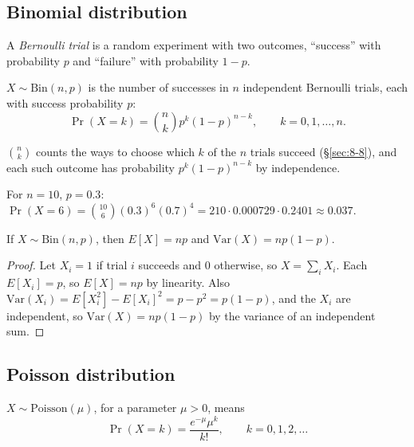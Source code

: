 \subsection{Binomial distribution}
\label{sec:10-8}

\begin{definition}
A \emph{Bernoulli trial} is a random experiment with two outcomes, ``success'' with probability $p$ and ``failure'' with probability $1-p$.
\end{definition}

\begin{definition}
$X\sim\mathrm{Bin}(n,p)$ is the number of successes in $n$ independent Bernoulli trials, each with success probability $p$:
\[
\Pr(X=k) = \binom{n}{k}p^k(1-p)^{n-k}, \qquad k=0,1,\dots,n.
\]
\end{definition}

\begin{note}
$\binom nk$ counts the ways to choose which $k$ of the $n$ trials succeed (\S\ref{sec:8-8}), and each such outcome has probability $p^k(1-p)^{n-k}$ by independence.
\end{note}

\begin{example}
For $n=10$, $p=0.3$: \ $\Pr(X=6)=\binom{10}6(0.3)^6(0.7)^4=210\cdot0.000729\cdot0.2401\approx0.037$.
\end{example}

\begin{proposition}
If $X\sim\mathrm{Bin}(n,p)$, then $E[X] = np$ and $\mathrm{Var}(X) = np(1-p)$.
\end{proposition}
\begin{proof}
Let $X_i=1$ if trial $i$ succeeds and $0$ otherwise, so $X=\sum_i X_i$. Each $E[X_i]=p$, so $E[X]=np$ by linearity. Also $\mathrm{Var}(X_i)=E[X_i^2]-E[X_i]^2=p-p^2=p(1-p)$, and the $X_i$ are independent, so $\mathrm{Var}(X)=np(1-p)$ by the variance of an independent sum.
\end{proof}

\subsection{Poisson distribution}
\label{sec:10-9}

\begin{definition}
$X\sim\mathrm{Poisson}(\mu)$, for a parameter $\mu>0$, means
\[
\Pr(X=k) = \frac{e^{-\mu}\mu^k}{k!}, \qquad k=0,1,2,\dots
\]
\end{definition}

